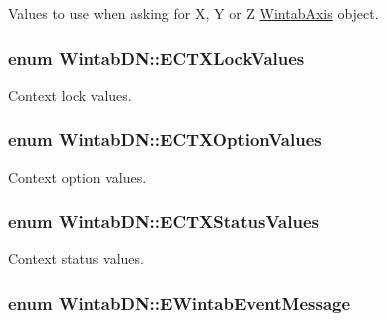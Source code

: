 Values to use when asking for X, Y or Z \hyperlink{struct_wintab_d_n_1_1_wintab_axis}{WintabAxis} object. 

\hypertarget{namespace_wintab_d_n_a4ae5c9d600336cd1fe11dd04cd207c31}{
\subsubsection[{ECTXLockValues}]{\setlength{\rightskip}{0pt plus 5cm}enum {\bf WintabDN::ECTXLockValues}}}
\label{namespace_wintab_d_n_a4ae5c9d600336cd1fe11dd04cd207c31}


Context lock values. 

\hypertarget{namespace_wintab_d_n_a701e8021b6889039ed562596a2d1bdd2}{
\subsubsection[{ECTXOptionValues}]{\setlength{\rightskip}{0pt plus 5cm}enum {\bf WintabDN::ECTXOptionValues}}}
\label{namespace_wintab_d_n_a701e8021b6889039ed562596a2d1bdd2}


Context option values. 

\hypertarget{namespace_wintab_d_n_a6d3f719c7eebc1f9b081c2d31678536e}{
\subsubsection[{ECTXStatusValues}]{\setlength{\rightskip}{0pt plus 5cm}enum {\bf WintabDN::ECTXStatusValues}}}
\label{namespace_wintab_d_n_a6d3f719c7eebc1f9b081c2d31678536e}


Context status values. 

\hypertarget{namespace_wintab_d_n_a4b98724153acf19dc7b44dc911e7fd0d}{
\subsubsection[{EWintabEventMessage}]{\setlength{\rightskip}{0pt plus 5cm}enum {\bf WintabDN::EWintabEventMessage}}}
\label{namespace_wintab_d_n_a4b98724153acf19dc7b44dc911e7fd0d}


